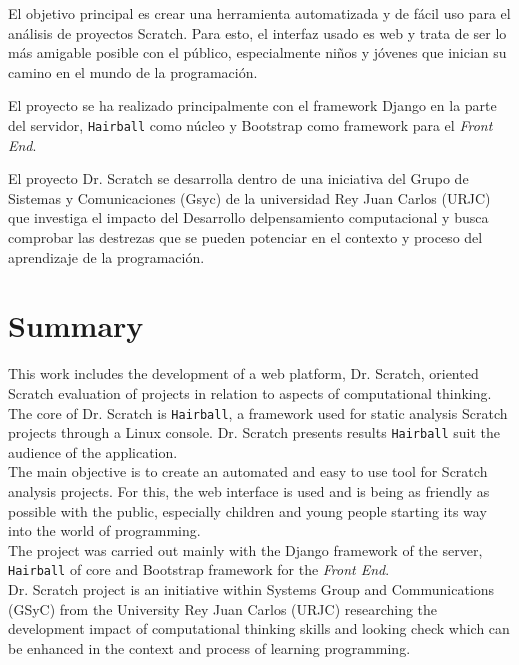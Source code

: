 \documentclass[a4paper, 12pt]{book}
\begin{document}
El objetivo principal es crear una herramienta automatizada y de fácil uso para el 
análisis de proyectos Scratch. Para esto, el interfaz usado es web y trata de ser 
lo más amigable posible con el público, especialmente niños y jóvenes que inician
su camino en el mundo de la programación.

El proyecto se ha realizado principalmente con el framework Django en la parte del
servidor, \texttt{Hairball} como núcleo y Bootstrap como framework para el \emph{Front End}.

El proyecto Dr. Scratch se desarrolla dentro de una iniciativa del Grupo de Sistemas
y Comunicaciones (Gsyc) de la universidad Rey Juan Carlos (URJC) que investiga el
impacto del Desarrollo delpensamiento computacional y busca comprobar las destrezas
que se pueden potenciar en el contexto y proceso del aprendizaje de la programación.




\chapter*{Summary}

This work includes the development of a web platform, Dr. Scratch, oriented
Scratch evaluation of projects in relation to aspects of computational thinking.
The core of Dr. Scratch is \texttt {Hairball}, a framework used for static analysis
Scratch projects through a Linux console. Dr. Scratch presents results
\texttt{Hairball} suit the audience of the application. \\

The main objective is to create an automated and easy to use tool for Scratch 
analysis projects. For this, the web interface is used and is being as friendly 
as possible with the public, especially children and young people starting
its way into the world of programming. \\

The project was carried out mainly with the Django framework of the server, 
\texttt{Hairball} of core and Bootstrap framework for the \emph{Front End}. \\

Dr. Scratch project is an initiative within Systems Group and Communications
(GSyC) from the University Rey Juan Carlos (URJC) researching the
development impact of computational thinking skills and looking check
which can be enhanced in the context and process of learning programming.
\end{document}
